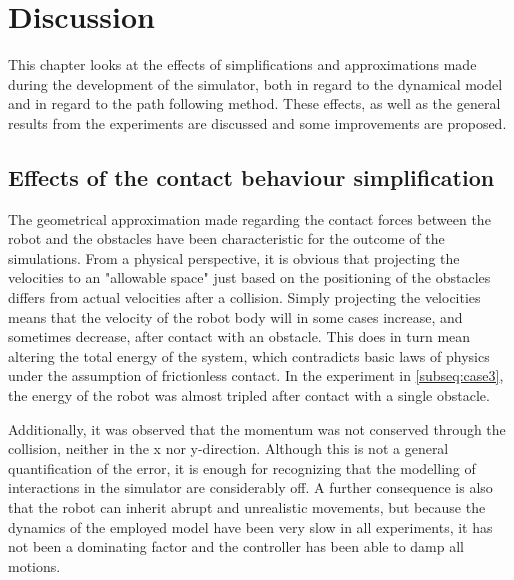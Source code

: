 \chapter{Discussion} \label{ch:discussion}

This chapter looks at the effects of simplifications and approximations made during the development of the simulator, both in regard to the dynamical model and in regard to the path following method. These effects, as well as the general results from the experiments are discussed and some improvements are proposed.

\section{Effects of the contact behaviour simplification}

The geometrical approximation made regarding the contact forces between the robot and the obstacles have been characteristic for the outcome of the simulations.
From a physical perspective, it is obvious that projecting the velocities to an "allowable space" just based on the positioning of the obstacles differs from actual velocities after a collision. Simply projecting the velocities means that the velocity of the robot body will in some cases increase, and sometimes decrease, after contact with an obstacle. This does in turn mean altering the total energy of the system, which contradicts basic laws of physics under the assumption of frictionless contact. In the experiment in \ref{subseq:case3}, the energy of the robot was almost tripled after contact with a single obstacle.

Additionally, it was observed that the momentum was not conserved through the collision, neither in the x nor y-direction.
Although this is not a general quantification of the error, it is enough for recognizing that the modelling of interactions in the simulator are considerably off. A further consequence is also that the robot can inherit abrupt and unrealistic movements, but because the dynamics of the employed model have been very slow in all experiments, it has not been a dominating factor and the controller has been able to damp all motions.


